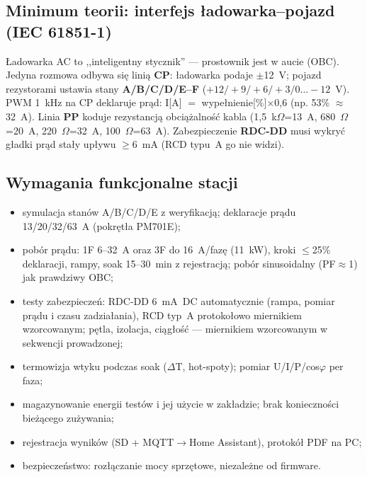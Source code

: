 \documentclass[11pt,a4paper]{article}
\newcommand{\ohm}{$\Omega$}
\begin{document}
\subsection{Minimum teorii: interfejs ładowarka--pojazd (IEC 61851-1)}
Ładowarka AC to ,,inteligentny stycznik'' --- prostownik jest w aucie (OBC). Jedyna rozmowa odbywa
się linią \textbf{CP}: ładowarka podaje $\pm$12~V; pojazd rezystorami ustawia stany
\textbf{A/B/C/D/E--F} ($+12/+9/+6/+3/0\ldots-12$~V). PWM 1~kHz na CP deklaruje prąd:
I[A] $=$ wypełnienie[\%]$\times$0,6 (np. 53\% $\approx$ 32~A). Linia \textbf{PP} koduje rezystancją
obciążalność kabla (1,5~k\ohm=13~A, 680~\ohm=20~A, 220~\ohm=32~A, 100~\ohm=63~A). Zabezpieczenie
\textbf{RDC-DD} musi wykryć gładki prąd stały upływu $\ge$6~mA (RCD typu~A go nie widzi).
\subsection{Wymagania funkcjonalne stacji}
\begin{itemize}
\item symulacja stanów A/B/C/D/E z weryfikacją; deklaracje prądu 13/20/32/63~A (pokrętła PM701E);
\item pobór prądu: 1F 6--32~A oraz 3F do 16~A/fazę (11~kW), kroki $\le$25\% deklaracji, rampy,
soak 15--30~min z rejestracją; pobór sinusoidalny (PF$\approx$1) jak prawdziwy OBC;
\item testy zabezpieczeń: RDC-DD 6~mA~DC automatycznie (rampa, pomiar prądu i czasu zadziałania),
RCD typ~A protokołowo miernikiem wzorcowanym; pętla, izolacja, ciągłość --- miernikiem wzorcowanym
w sekwencji prowadzonej;
\item termowizja wtyku podczas soak ($\Delta$T, hot-spoty); pomiar U/I/P/cos$\varphi$ per faza;
\item magazynowanie energii testów i jej użycie w zakładzie; brak konieczności bieżącego zużywania;
\item rejestracja wyników (SD + MQTT$\to$Home Assistant), protokół PDF na PC;
\item bezpieczeństwo: rozłączanie mocy sprzętowe, niezależne od firmware.
\end{itemize}
\end{document}
